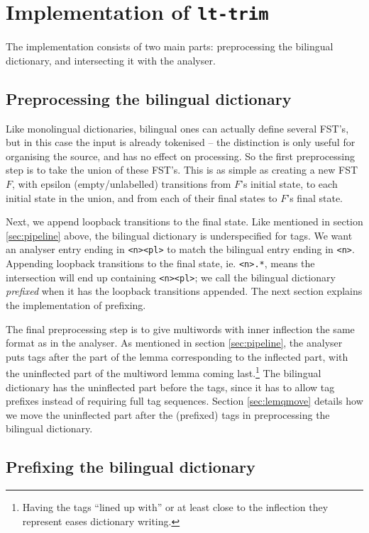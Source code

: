 \documentclass[10pt, a4paper]{article}
\newcommand{\ana}[1]{\texttt{#1}}
\newcommand{\tool}[1]{\texttt{#1}}
\begin{document}
\section{Implementation of \tool{lt-trim}}

The implementation consists of two main parts: preprocessing the
bilingual dictionary, and intersecting it with the analyser. 


\subsection{Preprocessing the bilingual dictionary}

Like monolingual dictionaries, bilingual ones can actually define
several FST's, but in this case the input is already tokenised -- the
distinction is only useful for organising the source, and has no
effect on processing. So the first preprocessing step is to take the
union of these FST's. This is as simple as creating a new FST $F$,
with epsilon (empty/unlabelled) transitions from $F$'s initial state,
to each initial state in the union, and from each of their final
states to $F$'s final state.

Next, we append loopback transitions to the final state. Like
mentioned in section \ref{sec:pipeline} above, the bilingual
dictionary is underspecified for tags. We want an analyser entry
ending in \ana{<n><pl>} to match the bilingual entry ending in
\ana{<n>}. Appending loopback transitions to the final state, ie.
\ana{<n>.*}, means the intersection will end up containing
\ana{<n><pl>}; we call the bilingual dictionary \emph{prefixed} when
it has the loopback transitions appended. The next section explains
the implementation of prefixing.

The final preprocessing step is to give multiwords with inner
inflection the same format as in the analyser. As mentioned in section
\ref{sec:pipeline}, the analyser puts tags after the part of the lemma
corresponding to the inflected part, with the uninflected part of the
multiword lemma coming last.\footnote{Having the tags ``lined up
with'' or at least close to the inflection they represent eases
dictionary writing.} The bilingual dictionary has the uninflected part
before the tags, since it has to allow tag prefixes instead of
requiring full tag sequences.  Section \ref{sec:lemqmove} details how
we move the uninflected part after the (prefixed) tags in
preprocessing the bilingual dictionary.

\subsection{Prefixing the bilingual dictionary}
\end{document}
